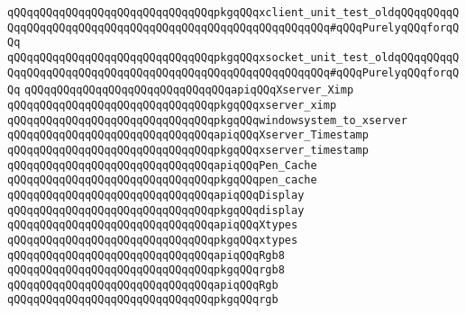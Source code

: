 \newline
\newline
\verb|qQQqqQQqqQQqqQQqqQQqqQQqqQQqqQQqpkgqQQqxclient_unit_test_oldqQQqqQQqqQQqqQQqqQQqqQQqqQQqqQQqqQQqqQQqqQQqqQQqqQQqqQQqqQQq#qQQqPurelyqQQqforqQQq|\newline
\verb|qQQqqQQqqQQqqQQqqQQqqQQqqQQqqQQqpkgqQQqxsocket_unit_test_oldqQQqqQQqqQQqqQQqqQQqqQQqqQQqqQQqqQQqqQQqqQQqqQQqqQQqqQQqqQQq#qQQqPurelyqQQqforqQQq|\newline
\newline
\verb|qQQqqQQqqQQqqQQqqQQqqQQqqQQqqQQqapiqQQqXserver_Ximp|\newline
\verb|qQQqqQQqqQQqqQQqqQQqqQQqqQQqqQQqpkgqQQqxserver_ximp|\newline
\verb|qQQqqQQqqQQqqQQqqQQqqQQqqQQqqQQqpkgqQQqwindowsystem_to_xserver|\newline
\newline
\verb|qQQqqQQqqQQqqQQqqQQqqQQqqQQqqQQqapiqQQqXserver_Timestamp|\newline
\verb|qQQqqQQqqQQqqQQqqQQqqQQqqQQqqQQqpkgqQQqxserver_timestamp|\newline
\newline
\verb|qQQqqQQqqQQqqQQqqQQqqQQqqQQqqQQqapiqQQqPen_Cache|\newline
\verb|qQQqqQQqqQQqqQQqqQQqqQQqqQQqqQQqpkgqQQqpen_cache|\newline
\newline
\verb|qQQqqQQqqQQqqQQqqQQqqQQqqQQqqQQqapiqQQqDisplay|\newline
\verb|qQQqqQQqqQQqqQQqqQQqqQQqqQQqqQQqpkgqQQqdisplay|\newline
\newline
\verb|qQQqqQQqqQQqqQQqqQQqqQQqqQQqqQQqapiqQQqXtypes|\newline
\verb|qQQqqQQqqQQqqQQqqQQqqQQqqQQqqQQqpkgqQQqxtypes|\newline
\newline
\verb|qQQqqQQqqQQqqQQqqQQqqQQqqQQqqQQqapiqQQqRgb8|\newline
\verb|qQQqqQQqqQQqqQQqqQQqqQQqqQQqqQQqpkgqQQqrgb8|\newline
\newline
\verb|qQQqqQQqqQQqqQQqqQQqqQQqqQQqqQQqapiqQQqRgb|\newline
\verb|qQQqqQQqqQQqqQQqqQQqqQQqqQQqqQQqpkgqQQqrgb|\newline
\newline

